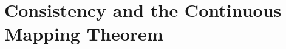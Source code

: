 \documentclass[12pt, block=fill]{beamer}
\newcommand{\paul}[1]{{\color{red}#1}}
\begin{document}
  
  
  
  
  

\section{Consistency and the Continuous Mapping Theorem}
\end{document}
